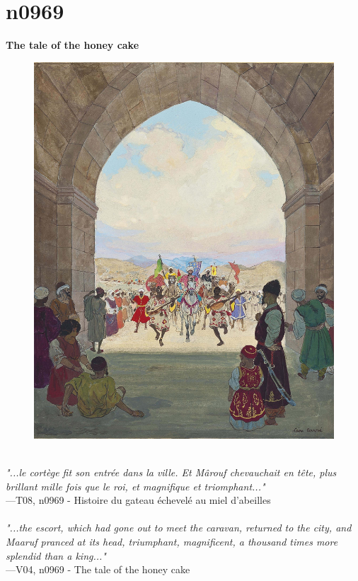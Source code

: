 \documentclass[../Carre_nights.tex]{subfiles}
\begin{document}
\newpage

\section{n0969}
\textbf{\Large{The tale of the honey cake}} \\

\begin{figure}[ht]
\centering
\includegraphics[height=\figsize]{illustrations/volume_8/T08, n0969 - Histoire du gateau échevelé au miel d'abeilles.jpg}
\end{figure}

\textit{\\
"...le cortège fit son entrée dans la ville. Et Mârouf chevauchait en tête, plus brillant mille fois que le roi, et magnifique et triomphant..."} \\
—T08, n0969 - Histoire du gateau échevelé au miel d'abeilles \\~\\
\textit{"...the escort, which had gone out to meet the caravan, returned to the city, and Maaruf pranced at its head, triumphant, magnificent, a thousand times more splendid than a king..."} \\
—V04, n0969 - The tale of the honey cake
\end{document}
